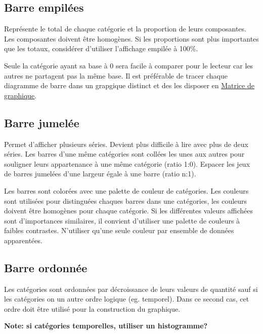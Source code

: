 \documentclass[a4paper,12pt]{article}
\begin{document}
\begin{multicols}{2}
\subsection*{Barre empilées}
\label{sec:orgc6c3d67}
Représente le total de chaque catégorie et la proportion de leurs composantes. Les composantes doivent être homogènes. Si les proportions sont plus importantes que les totaux, considérer d'utiliser l'affichage empilée à 100\%. \autocite{mikeyiHowChooseRight2020}

Seule la catégorie ayant sa base à 0 sera facile à comparer pour le lecteur car les autres ne partagent pas la même base.\autocite{jonathanschwabishComparingCategories2021} Il est préférable de tracer chaque diagramme de barre dans un grapgique distinct et des les disposer en \hyperref[sec:org520b4af]{Matrice de graphique}. \autocite{jonathanschwabishComparingCategories2021}
\subsection*{Barre jumelée}
\label{sec:org7451464}
Permet d'afficher plusieurs séries. Devient plus difficile à lire avec plus de deux séries. \autocite{alansmithLexiqueVisuel}
Les barres d'une même catégories sont collées les unes aux autres pour souligner leurs appartenance à une même catégorie (ratio 1:0). Espacer les jeux de barres jumelées d'une largeur égale à une barre (ratio n:1).

Les barres sont colorées avec une palette de couleur de catégories. Les couleurs sont utilisées pour distinguées chaques barres dans une catégories, les couleurs doivent être homogènes pour chaque catégorie. Si les différentes valeurs affichées sont d'importances similaires, il convient d'utiliser une palette de couleurs à faibles contrastes. N'utiliser qu'une seule couleur par ensemble de données apparentées. \autocite{stephenfewComponentlevelGraphDesign2012}
\subsection*{Barre ordonnée}
\label{sec:orga4bd1f2}
Les catégories sont ordonnées par décroissance de leurs valeurs de quantité\autocite{jonathanschwabishComparingCategories2021} sauf si les catégories on un autre ordre logique (eg. temporel). Dans ce second cas, cet ordre doit être utilisé pour la construction du graphique. \autocite{wilkeVisualizingAmounts2019}

\textbf{Note: si catégories temporelles, utiliser un histogramme?}


\end{multicols}
\end{document}
